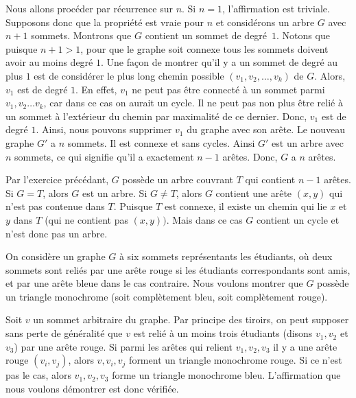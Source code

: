 \begin{sol}


Nous allons procéder par récurrence sur $n$. Si $n = 1$, l'affirmation est triviale. Supposons donc que la propriété est vraie pour $n$ et considérons un arbre $G$ avec $n+1$ sommets. Montrons que $G$ contient un sommet de degré~$1$. Notons que puisque $n + 1 > 1$, pour que le graphe soit connexe tous les sommets doivent avoir au moins degré $1$. Une façon de montrer qu'il y a un sommet de degré au plus $1$ est de considérer le plus long chemin possible $(v_1, v_2, \ldots, v_k)$ de $G$. Alors, $v_1$ est de degré $1$. En effet, $v_1$ ne peut pas être connecté à un sommet parmi $v_1,v_2 \ldots v_k$, car dans ce cas on aurait un cycle. Il ne peut pas non plus être relié à un sommet à l’extérieur du chemin par maximalité de ce dernier. Donc, $v_1$ est de degré $1$. Ainsi, nous pouvons supprimer $v_1$ du graphe avec son arête.
Le nouveau graphe $G'$ a $n$ sommets. Il est connexe et sans cycles. Ainsi $G'$ est un arbre avec $n$ sommets, ce qui signifie qu'il a exactement $n-1$ arêtes. Donc, $G$ a $n$ arêtes.\\

\end{sol}


\begin{sol}

 Par l’exercice précédant, $G$ possède un arbre couvrant $T$ qui contient $n-1$ arêtes. Si $G=T$, alors $G$ est un arbre. Si $G \neq T$, alors $G$ contient une arête $(x,y)$ qui n’est pas contenue dans $T$. Puisque $T$ est connexe, il existe un chemin qui lie $x$ et $y$ dans $T$ (qui ne contient pas $(x,y))$. Mais dans ce cas $G$ contient un cycle et n’est donc pas un arbre.\\

 \end{sol}

\begin{sol}




On considère un graphe $G$ à six sommets représentants les étudiants, où deux sommets sont reliés par une arête rouge si les étudiants correspondants sont amis, et par une arête bleue dans le cas contraire. Nous voulons montrer que $G$ possède un triangle monochrome (soit complètement bleu, soit complètement rouge).

Soit $v$ un sommet arbitraire du graphe. Par principe des tiroirs, on peut supposer sans perte de généralité que $v$ est relié à un moins trois étudiants (disons $v_1, v_2 $ et $v_3$) par une arête rouge. Si parmi les arêtes qui relient $v_1, v_2, v_3$ il y a une arête rouge $(v_i,v_j)$, alors $v,v_i,v_j$ forment un triangle monochrome rouge. Si ce n’est pas le cas, alors $v_1,v_2,v_3$ forme un triangle monochrome bleu. L’affirmation que nous voulons démontrer est donc vérifiée.

\end{sol}





